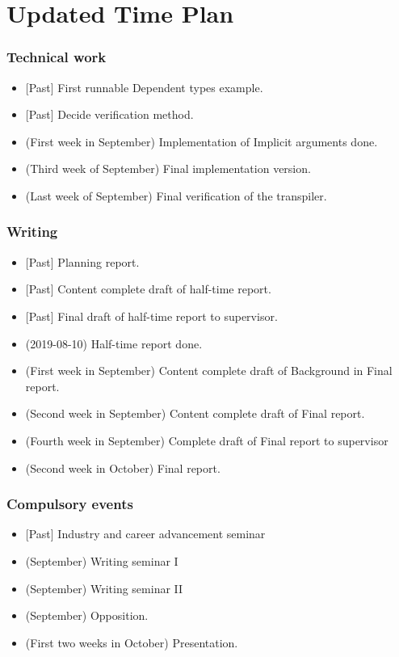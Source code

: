\documentclass[parskip=half]{scrartcl}
\begin{document}
\newpage
\section{Updated Time Plan}

\subsubsection*{Technical work}
\begin{itemize}

  \item \textit{\color{gray}}[Past] First runnable Dependent types example.
  \item \textit{\color{gray}}[Past] Decide verification method.
  \item (First week in September) Implementation of Implicit arguments done.
  \item (Third week of September) Final implementation version.
  \item (Last week of September) Final verification of the transpiler.
\end{itemize}

\subsubsection*{Writing}
\begin{itemize}
  \item \textit{\color{gray}}[Past] Planning report.
  \item \textit{\color{gray}}[Past] Content complete draft of half-time report.
  \item \textit{\color{gray}}[Past] Final draft of half-time report to supervisor.
  \item (2019-08-10) Half-time report done.
  \item (First week in September) Content complete draft of Background in Final
    report.
  \item (Second week in September) Content complete draft of Final report.
  \item (Fourth week in September) Complete draft of Final report to supervisor
  \item (Second week in October) Final report.
\end{itemize}

\subsubsection*{Compulsory events}
\begin{itemize}
  \item \textit{\color{gray}}[Past] Industry and career advancement seminar
  \item (September) Writing seminar I
  \item (September) Writing seminar II
  \item (September) Opposition.
  \item (First two weeks in October) Presentation.
\end{itemize}



% 

\newpage
\printbibliography{}
\end{document}
